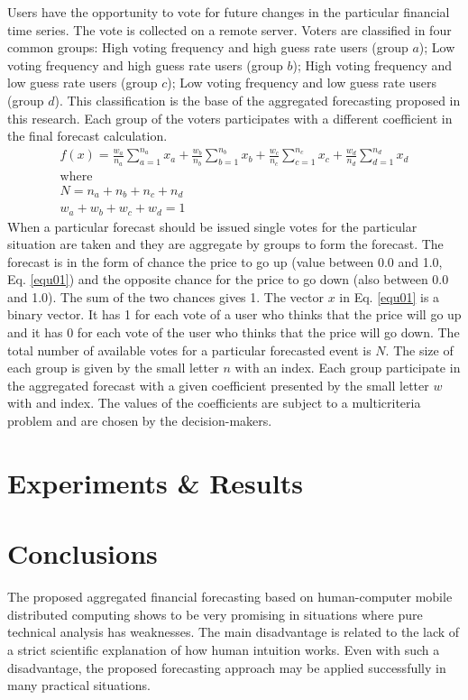 \documentclass[runningheads]{llncs}
\begin{document}
Users have the opportunity to vote for future changes in the particular financial time series. The vote is collected on a remote server. Voters are classified in four common groups: High voting frequency and high guess rate users (group $a$); Low voting frequency and high guess rate users (group $b$); High voting frequency and low guess rate users (group $c$); Low voting frequency and low guess rate users (group $d$). This classification is the base of the aggregated forecasting proposed in this research. Each group of the voters participates with a different coefficient in the final forecast calculation. 
%
\begin{equation}
\begin{array}{l}
f(x) = \frac{w_{a}}{n_{a}} \sum_{a=1}^{n_{a}} x_{a} + \frac{w_{b}}{n_{b}} \sum_{b=1}^{n_{b}} x_{b} + \frac{w_{c}}{n_{c}} \sum_{c=1}^{n_{c}} x_{c} + \frac{w_{d}}{n_{d}} \sum_{d=1}^{n_{d}} x_{d} \\
\text{where} \\
N = n_{a} + n_{b} + n_{c} + n_{d} \\
w_{a} + w_{b} + w_{c} + w_{d} = 1
\end{array}
\label{equ01}
\end{equation}
%
When a particular forecast should be issued single votes for the particular situation are taken and they are aggregate by groups to form the forecast. The forecast is in the form of chance the price to go up (value between 0.0 and 1.0, Eq. \ref{equ01}) and the opposite chance for the price to go down (also between 0.0 and 1.0). The sum of the two chances gives 1. The vector $x$ in Eq. \ref{equ01} is a binary vector. It has 1 for each vote of a user who thinks that the price will go up and it has 0 for each vote of the user who thinks that the price will go down. The total number of available votes for a particular forecasted event is $N$. The size of each group is given by the small letter $n$ with an index. Each group participate in the aggregated forecast with a given coefficient presented by the small letter $w$ with and index. The values of the coefficients are subject to a multicriteria problem and are chosen by the decision-makers.
%
\section{Experiments \& Results}
%
\section{Conclusions}
%
The proposed aggregated financial forecasting based on human-computer mobile distributed computing shows to be very promising in situations where pure technical analysis has weaknesses. The main disadvantage is related to the lack of a strict scientific explanation of how human intuition works. Even with such a disadvantage, the proposed forecasting approach may be applied successfully in many practical situations. 
\end{document}
